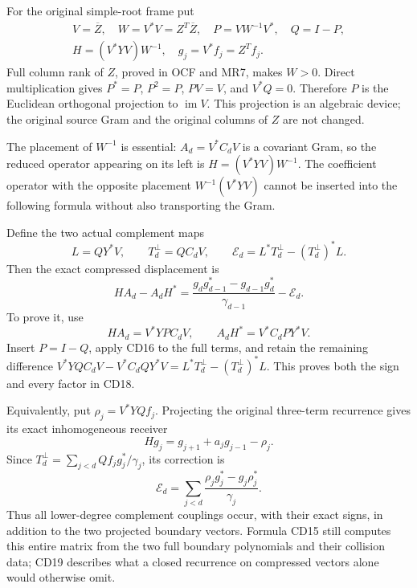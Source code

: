 For the original simple-root frame put
\[
\begin{gathered}
 V=\overline Z,\quad W=V^*V=Z^T\overline Z,\quad P=VW^{-1}V^*,\quad Q=I-P,\\
 H=(V^*YV)W^{-1},\quad g_j=V^*f_j=Z^Tf_j.
\end{gathered}
\]
Full column rank of \(Z\), proved in OCF and MR7, makes \(W>0\).
Direct multiplication gives \(P^*=P\), \(P^2=P\),
\(PV=V\), and \(V^*Q=0\). Therefore \(P\) is the Euclidean
orthogonal projection to \(\operatorname{im}V\). This projection is
an algebraic device; the original source Gram and the original columns
of \(Z\) are not changed.

The placement of \(W^{-1}\) is essential: \(A_d=V^*C_dV\) is a
covariant Gram, so the reduced operator appearing on its left is
\(H=(V^*YV)W^{-1}\). The coefficient operator with the opposite
placement \(W^{-1}(V^*YV)\) cannot be inserted into the following
formula without also transporting the Gram.

Define the two actual complement maps
\[
 L=QY^*V,\qquad T_d^{\perp}=QC_dV,\qquad
 \mathcal E_d=L^*T_d^{\perp}-(T_d^{\perp})^*L.
\]
Then the exact compressed displacement is
\begin{equation}\label{cdroot:eq:compressed-displacement}
 \boxed{HA_d-A_dH^*=
 \frac{g_dg_{d-1}^*-g_{d-1}g_d^*}{\gamma_{d-1}}
   -\mathcal E_d.}
 \tag{CD18}
\end{equation}
To prove it, use
\[
 HA_d=V^*YPC_dV,\qquad A_dH^*=V^*C_dPY^*V.
\]
Insert \(P=I-Q\), apply CD16 to the full terms, and retain the
remaining difference
\(V^*YQC_dV-V^*C_dQY^*V=L^*T_d^\perp-(T_d^\perp)^*L\).
This proves both the sign and every factor in CD18.

Equivalently, put \(\rho_j=V^*YQf_j\). Projecting the original
three-term recurrence gives its exact inhomogeneous receiver
\[
 Hg_j=g_{j+1}+a_jg_{j-1}-\rho_j.
\]
Since \(T_d^\perp=\sum_{j<d}Qf_jg_j^*/\gamma_j\), its correction is
\begin{equation}\label{cdroot:eq:correction-sum}
 \mathcal E_d=\sum_{j<d}
    \frac{\rho_jg_j^*-g_j\rho_j^*}{\gamma_j}.
 \tag{CD19}
\end{equation}
Thus all lower-degree complement couplings occur, with their exact
signs, in addition to the two projected boundary vectors. Formula CD15
still computes this entire matrix from the two full boundary
polynomials and their collision data; CD19 describes what a closed
recurrence on compressed vectors alone would otherwise omit.


